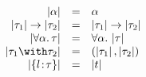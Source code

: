 
\[
\begin{array}{rcl}
  \image \alpha                     & = & \alpha \\
  \image {\tau_1} \to \image {\tau_2} & = & \image {\tau_1} \to \image {\tau_2} \\
  \image {\Forall \alpha \tau}      & = & \Forall \alpha \image \tau \\
  \image {\tau_1 \Intersect \tau_2}   & = & \Pair {\image {\tau_1}} {\image {\tau_2}} \\
  \image {\RecTy l \tau}            & = & \image t
\end{array}
\]